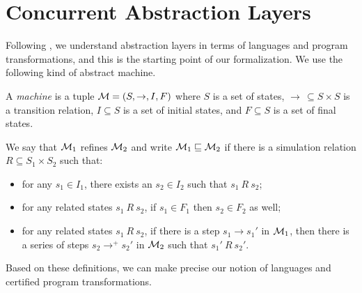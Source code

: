 \section{Concurrent Abstraction Layers}
\label{sec:layer}

Following \cite{dscal15},
we understand abstraction layers
in terms of languages and program transformations,
and this is the starting point
of our formalization.
We use the following kind of abstract machine.

\begin{definition}[Machine]
A \emph{machine} is a tuple $\mathcal{M} = (S, \rightarrow, I, F)$
where $S$ is a set of states,
$\rightarrow \, \subseteq S \times S$ is a transition relation,
$I \subseteq S$ is a set of initial states, and
$F \subseteq S$ is a set of final states.
\end{definition}


\begin{definition}[Refinement]
We say that {\small$\mathcal{M}_1$} refines {\small $\mathcal{M}_2$}
and write {\small $\mathcal{M}_1 \sqsubseteq \mathcal{M}_2$}
if there is a simulation relation {\small $R \subseteq S_1 \times S_2$}
such that:
\begin{itemize}
\item for any $s_1 \in I_1$,
	there exists an $s_2 \in I_2$
	such that $s_1 \ R\ s_2$;
\item for any related states $s_1\ R\ s_2$, %
	if $s_1 \in F_1$ then $s_2 \in F_2$ as well;
\item for any related states $s_1\ R\ s_2$, %
	if there is a step $s_1 \rightarrow s_1'$ in $\mathcal{M}_1$,
	then there is a series of steps $s_2 \rightarrow^+ s_2'$ in $\mathcal{M}_2$
	such that $s_1'\ R\ s_2'$.
\end{itemize}
\end{definition}

Based on these definitions,
we can make precise our notion of languages and
certified program transformations.

